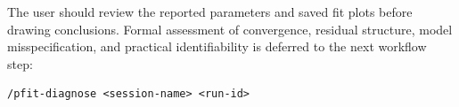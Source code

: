 The user should review the reported parameters and saved fit plots before
drawing conclusions. Formal assessment of convergence, residual structure,
model misspecification, and practical identifiability is deferred to the next
workflow step:

\begin{verbatim}
/pfit-diagnose <session-name> <run-id>
\end{verbatim}
